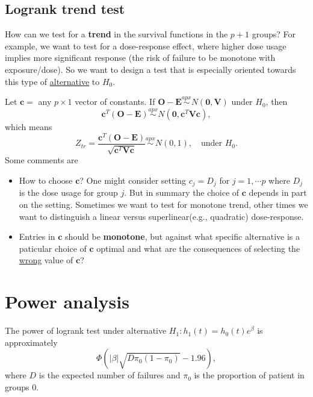 \documentclass[a4paper,12pt]{article}
\begin{document}
\subsection{Logrank trend test}
\label{sec:logrank-trend-test}


How can we test for a \textbf{trend} in the survival functions in the $p+1$ groups? For example, we want to test for a dose-response effect, where higher dose usage implies more significant response (the risk of failure to be monotone with exposure/dose). So we want to design a test that is especially oriented towards this type of \underline{alternative} to $H_0$.
\par
Let $\bm{c} = $ any $p\times 1$ vector of constants. If $\bm{O} - \bm{E} \overset{apx}{\sim} N\left(\bm{0}, \bm{V}\right)$ under $H_0$, then
\[
  \bm{c}^T\left(\bm{O} - \bm{E}\right)
  \overset{apx}{\sim}
  N\left(\bm{0}, \bm{c}^T\bm{V}\bm{c}\right)
  ,
\]
which means
\[
  Z_{tr} = \frac{
    \bm{c}^T\left(\bm{O} - \bm{E}\right)
  }{
    \sqrt{\bm{c}^T\bm{V}\bm{c}}
  }
  \overset{apx}{\sim}
  N\left(0, 1\right)
  ,\quad\text{under }H_0.
\]
Some comments are
\begin{itemize}
\item How to choose $\bm{c}$? One might consider setting $c_j = D_j$ for $j = 1, \cdots p$ where $D_j$ is the dose usage for group $j$. But in summary the choice of $\bm{c}$ depends in part on the setting. Sometimes we want to test for monotone trend, other times we want to distinguish a linear versus superlinear(e.g., quadratic) dose-response. 
\item Entries in $\bm{c}$ should be \textbf{monotone}, but against what specific alternative is a paticular choice of $\bm{c}$ optimal and what are the consequences of selecting the \underline{wrong} value of $\bm{c}$?
\end{itemize}

\section{Power analysis}
\label{sec:power-analysis}

The power of logrank test under alternative $H_1: h_1\left(t\right) = h_0\left(t\right)e^\beta$ is approximately
\[
  \Phi\left(
    \left|\beta\right|
    \sqrt{D\pi_0\left(1 - \pi_0\right)}
    - 1.96
  \right)
  ,
\]
where $D$ is the expected number of failures and $\pi_0$ is the proportion of patient in groups 0.
\end{document}
